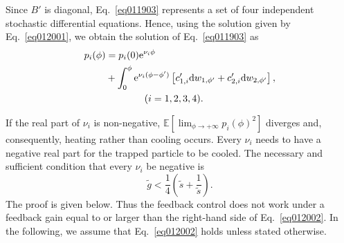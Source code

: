 \documentclass[aps,pra,superscriptaddress,twocolumn
]{revtex4-2}
\newcommand{\e}{\mathrm{e}}
\renewcommand{\d}{{\rm d}}
\begin{document}
 Since $B'$ is diagonal, 
 Eq.~\eqref{eq011903} represents 
 a set of four independent stochastic differential equations.
 Hence, using the solution given by Eq.~\eqref{eq012001}, 
 we obtain the solution of Eq.~\eqref{eq011903} as 
 \begin{alignat}{1}
  p_i(\phi) &= p_i(0)\e^{\nu_i \phi} \notag \\
  &+ \int_0^\phi \e^{\nu_i(\phi-\phi')}\left[
  c'_{1,i} \d w_{1,\phi'} + c'_{2,i} \d w_{2,\phi'}
  \right],\notag \\
   & \qquad \qquad (i=1,2,3,4).
 \end{alignat}
 
 
 If the real part of $\nu_i$ is non-negative,
 $\displaystyle \mathbb{E}\left[ \lim_{\phi \to +\infty} p_i (\phi)^2\right]$ diverges 
 and, consequently, heating rather than cooling occurs. 
 Every $\nu_i$ needs to have a negative real part 
 for the trapped particle to be cooled.
 The necessary and sufficient condition that every $\nu_i$ be negative is 
 \begin{equation}
  \tilde g < \frac{1}{4}\left(\tilde s + \frac{1}{\tilde s} \right).
   \label{eq012002}
 \end{equation}
 The proof is given below.
 Thus the feedback control does not work 
 under a feedback gain equal to or larger than the right-hand side of Eq.~\eqref{eq012002}.
 In the following, we assume that Eq.~\eqref{eq012002} holds 
 unless stated otherwise.
 
\end{document}
